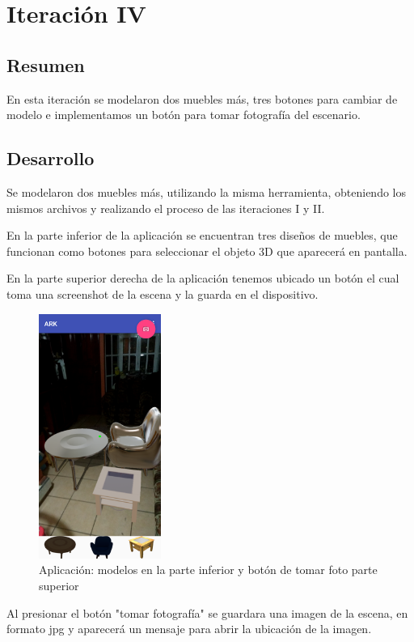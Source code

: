 \section{Iteración IV}
\subsection{Resumen}
En esta iteración se modelaron dos muebles más, tres botones para cambiar de modelo e implementamos un botón para tomar fotografía del escenario.
\subsection{Desarrollo}
Se modelaron dos muebles más, utilizando la misma herramienta, obteniendo los mismos archivos y realizando el proceso de las iteraciones I y II.

En la parte inferior de la aplicación se encuentran tres diseños de muebles, que funcionan como botones para seleccionar el objeto 3D que aparecerá en pantalla.

En la parte superior derecha de la aplicación tenemos ubicado un botón el cual toma una screenshot de la escena y la guarda en el dispositivo.

\begin{figure}[H]
	\centering
	\includegraphics[width=4cm,height=8cm]{imagenes/iteraciones/all.png}
	\caption{Aplicación: modelos en la parte inferior y botón de tomar foto parte superior}
	\label{fig:aplicacion}
\end{figure} 

Al presionar el botón "tomar fotografía" se guardara una imagen de la escena, en formato jpg y aparecerá un mensaje para abrir la ubicación de la imagen.  

